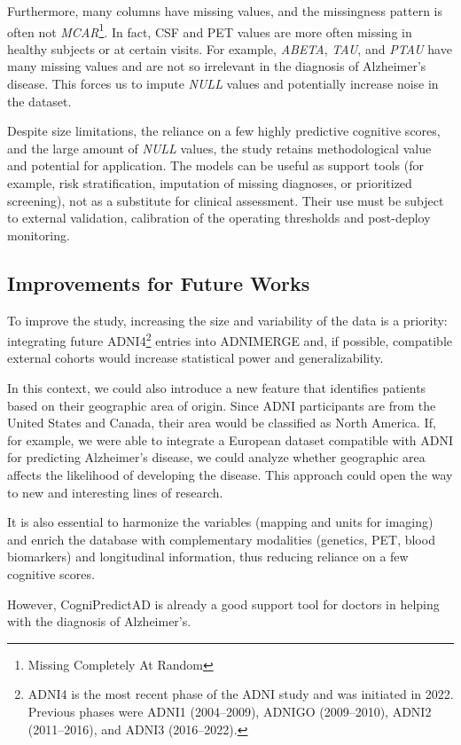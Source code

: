 Furthermore, many columns have missing values, and the missingness pattern is often not \textit{MCAR}\footnote{Missing Completely At Random}. In fact, CSF and PET values are more often missing in healthy subjects or at certain visits. For example, \textit{ABETA}, \textit{TAU}, and \textit{PTAU} have many missing values and are not so irrelevant in the diagnosis of Alzheimer's disease. This forces us to impute \textit{NULL} values and potentially increase noise in the dataset.

\vspace{2mm}

Despite size limitations, the reliance on a few highly predictive cognitive scores, and the large amount of \textit{NULL} values, the study retains methodological value and potential for application. The models can be useful as support tools (for example, risk stratification, imputation of missing diagnoses, or prioritized screening), not as a substitute for clinical assessment. Their use must be subject to external validation, calibration of the operating thresholds and post-deploy monitoring.

\subsection{Improvements for Future Works}
To improve the study, increasing the size and variability of the data is a priority: integrating future ADNI4\footnote{ADNI4 is the most recent phase of the ADNI study and was initiated in 2022. Previous phases were ADNI1 (2004–2009), ADNIGO (2009–2010), ADNI2 (2011–2016), and ADNI3 (2016–2022).} entries into ADNIMERGE and, if possible, compatible external cohorts would increase statistical power and generalizability.

\vspace{2mm}

In this context, we could also introduce a new feature that identifies patients based on their geographic area of origin. Since ADNI participants are from the United States and Canada, their area would be classified as North America. If, for example, we were able to integrate a European dataset compatible with ADNI for predicting Alzheimer's disease, we could analyze whether geographic area affects the likelihood of developing the disease. This approach could open the way to new and interesting lines of research.

It is also essential to harmonize the variables (mapping and units for imaging) and enrich the database with complementary modalities (genetics, PET, blood biomarkers) and longitudinal information, thus reducing reliance on a few cognitive scores.

However, CogniPredictAD is already a good support tool for doctors in helping with the diagnosis of Alzheimer's. 
